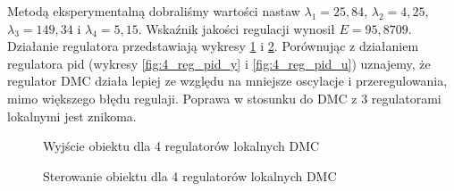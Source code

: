 Metodą eksperymentalną dobraliśmy wartości nastaw $\lambda_1=25,84$, $\lambda_2=4,25$, $\lambda_3=149,34$ i $\lambda_4=5,15$. Wskaźnik jakości regulacji wynosił $E=95,8709$. Działanie regulatora przedstawiają wykresy \ref{fig:42_reg_dmc_y} i \ref{fig:42_reg_dmc_u}. Porównując z działaniem regulatora pid (wykresy \ref{fig:4_reg_pid_y} i \ref{fig:4_reg_pid_u}) uznajemy, że regulator DMC działa lepiej ze względu na mniejsze oscylacje i przeregulowania, mimo większego błędu regulaji. Poprawa w stosunku do DMC z 3 regulatorami lokalnymi jest znikoma.

\begin{figure}[H]
\centering
{}
\caption{Wyjście obiektu dla 4 regulatorów lokalnych DMC}
\label{fig:42_reg_dmc_y}
\end{figure}

\begin{figure}[H]
\centering
{}
\caption{Sterowanie obiektu dla 4 regulatorów lokalnych DMC}
\label{fig:42_reg_dmc_u}
\end{figure}
